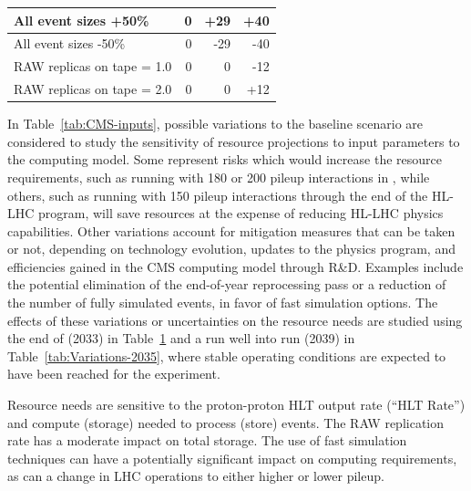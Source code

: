 \begin{table}[tbph]
\begin{tabular}{|l|r|r|r|}
    \cellcolor{tablerowheader} All event sizes +50\%               &    0             &  +29       &  +40  \\ \hline  
    \cellcolor{tablerowheader} All event sizes -50\%               &    0             &  -29       &  -40  \\ \hline
    \cellcolor{tablerowheader} RAW replicas on tape = 1.0          &    0             &    0       &  -12  \\ \hline
    \cellcolor{tablerowheader} RAW replicas on tape = 2.0          &    0             &    0       &  +12  \\ \hline     
	\end{tabular}
    \label{tab:Variations-2030}
\end{table}

In Table~\ref{tab:CMS-inputs}, possible variations to the baseline scenario are considered to study the sensitivity of resource projections to input parameters to the computing model. Some represent risks which would increase the resource requirements, such as running with 180 or 200 pileup interactions in \RunFour, while others, such as running with 150 pileup interactions through the end of the \gls{HL-LHC} program, will save resources at the expense of reducing HL-LHC physics capabilities.
Other variations account for mitigation measures that can be taken or not, depending on technology evolution, updates to the physics program, and efficiencies gained in the CMS computing model through R\&D. Examples include the potential elimination of the end-of-year reprocessing pass or a reduction of the number of fully simulated events, in favor of fast simulation options. The effects of these variations or uncertainties on the resource needs are studied using the end of \RunFour (2033) in Table~\ref{tab:Variations-2030} and a run well into run \RunFive (2039) in Table~\ref{tab:Variations-2035}, where stable operating conditions are expected to have been reached for the experiment. 

Resource needs are sensitive to the proton-proton HLT output rate (``HLT Rate'') and compute (storage) needed to process (store) events. The RAW replication rate has a moderate impact on total storage. The use of fast simulation techniques can have a potentially significant impact on computing requirements, as can a change in LHC operations to either higher or lower pileup. 

